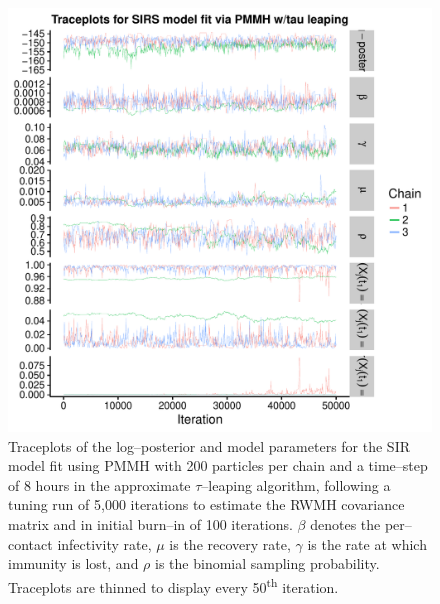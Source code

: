 \begin{figure}[htbp]
	\centering
	\includegraphics[width=0.9\linewidth]{figures/sirs_pomp_approx_traceplots_np200}
	\caption[Simulation 1 MCMC traceplots for an SIRS model fit using PMMH with exact particle paths with 200 particles per chain.]{Traceplots of the log--posterior and model parameters for the SIR model fit using PMMH with 200 particles per chain and a time--step of 8 hours in the approximate $ \tau $--leaping algorithm, following a tuning run of 5,000 iterations to estimate the RWMH covariance matrix and in initial burn--in of 100 iterations. $ \beta $ denotes the per--contact infectivity rate, $ \mu $ is the recovery rate, $\gamma$ is the rate at which immunity is lost, and $ \rho $ is the binomial sampling probability. Traceplots are thinned to display every 50\textsuperscript{th} iteration.}
	\label{fig:sirspompapproxtraceplotsnp200}
\end{figure}


